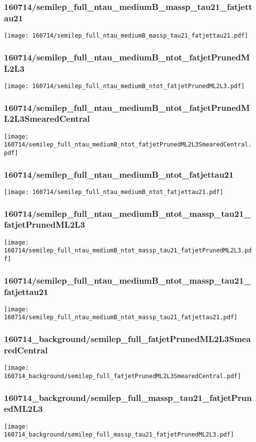 \begin{frame}
   \frametitle{\small 160714/semilep\_full\_ntau\_mediumB\_massp\_tau21\_fatjettau21}
   \centering
   \texttt{[image: 160714/semilep\_full\_ntau\_mediumB\_massp\_tau21\_fatjettau21.pdf]}
\end{frame}

\begin{frame}
   \frametitle{\small 160714/semilep\_full\_ntau\_mediumB\_ntot\_fatjetPrunedML2L3}
   \centering
   \texttt{[image: 160714/semilep\_full\_ntau\_mediumB\_ntot\_fatjetPrunedML2L3.pdf]}
\end{frame}

\begin{frame}
   \frametitle{\small 160714/semilep\_full\_ntau\_mediumB\_ntot\_fatjetPrunedML2L3SmearedCentral}
   \centering
   \texttt{[image: 160714/semilep\_full\_ntau\_mediumB\_ntot\_fatjetPrunedML2L3SmearedCentral.pdf]}
\end{frame}

\begin{frame}
   \frametitle{\small 160714/semilep\_full\_ntau\_mediumB\_ntot\_fatjettau21}
   \centering
   \texttt{[image: 160714/semilep\_full\_ntau\_mediumB\_ntot\_fatjettau21.pdf]}
\end{frame}

\begin{frame}
   \frametitle{\small 160714/semilep\_full\_ntau\_mediumB\_ntot\_massp\_tau21\_fatjetPrunedML2L3}
   \centering
   \texttt{[image: 160714/semilep\_full\_ntau\_mediumB\_ntot\_massp\_tau21\_fatjetPrunedML2L3.pdf]}
\end{frame}

\begin{frame}
   \frametitle{\small 160714/semilep\_full\_ntau\_mediumB\_ntot\_massp\_tau21\_fatjettau21}
   \centering
   \texttt{[image: 160714/semilep\_full\_ntau\_mediumB\_ntot\_massp\_tau21\_fatjettau21.pdf]}
\end{frame}

\begin{frame}
   \frametitle{\small 160714\_background/semilep\_full\_fatjetPrunedML2L3SmearedCentral}
   \centering
   \texttt{[image: 160714\_background/semilep\_full\_fatjetPrunedML2L3SmearedCentral.pdf]}
\end{frame}

\begin{frame}
   \frametitle{\small 160714\_background/semilep\_full\_massp\_tau21\_fatjetPrunedML2L3}
   \centering
   \texttt{[image: 160714\_background/semilep\_full\_massp\_tau21\_fatjetPrunedML2L3.pdf]}
\end{frame}

